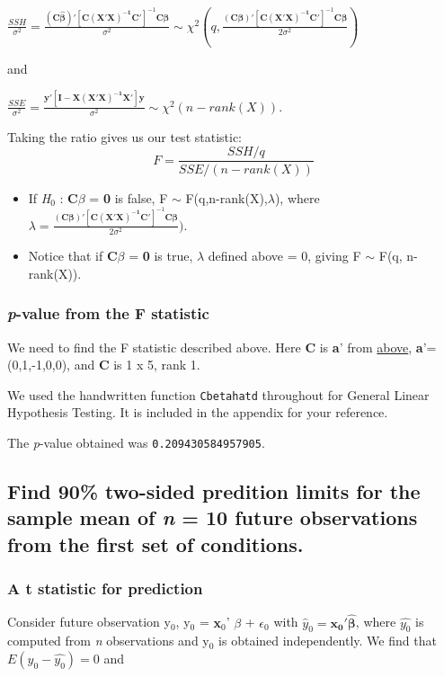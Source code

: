 \documentclass[11pt]{article}
\begin{document}
\(\frac{SSH}{\sigma^2} = \frac{(\mathbf{C\hat{\beta}})'[\mathbf{C(X'X)^{-1}C}']^{-1}\mathbf{C\hat{\beta}}}{\sigma^2}
\sim
\chi^2(q,\frac{(\mathbf{C\beta})'[\mathbf{C(X'X)^{-1}C}']^{-1}\mathbf{C\beta}}{2\sigma^2})\)

\noindent and

\(\frac{SSE}{\sigma^2} = \frac{\mathbf{y}'[\mathbf{I} -
\mathbf{X(X'X)^{-1}X}']\mathbf{y}}{\sigma^2} \sim \chi^2(n-rank(X)).\)

Taking the ratio gives us our test statistic:
$$F = \frac{SSH/q}{SSE/(n-rank(X))}$$

\begin{itemize}
\item If \emph{H$_0$} : \textbf{C$\beta$} = \textbf{0} is false, F $\sim$ F(q,n-rank(X),$\lambda$), where
  $\lambda =
  \frac{(\mathbf{C\beta})'[\mathbf{C(X'X)^{-1}C}']^{-1}\mathbf{C\beta}}{2\sigma^2})$.
\item Notice that if \textbf{C$\beta$} = \textbf{0} is true, $\lambda$ defined above = 0, giving F
  $\sim$ F(q, n-rank(X)).
\end{itemize}
\subsubsection{\emph{p}-value from the F statistic}
\label{sec-1-4-2}


We need to find the F statistic described above. Here \textbf{C} is \textbf{a}' from
\hyperref[Tau1Tau2]{above}, \textbf{a}'=(0,1,-1,0,0), and \textbf{C} is 1 x 5, rank 1.

We used the handwritten function \verb~Cbetahatd~ throughout for
General Linear Hypothesis Testing. It is included in the appendix for
your reference.

The \emph{p}-value obtained was \texttt{0.209430584957905}. 
\subsection{Find 90\% two-sided predition limits for the sample mean of \emph{n} = 10 future observations from the first set of conditions.}
\label{sec-1-5}
\subsubsection{A t statistic for prediction}
\label{sec-1-5-1}


Consider future observation y$_0$, y$_0$ = \textbf{x$_0$}' $\beta$ + $\epsilon$$_0$ with
$\hat{y}_0 = \mathbf{x_0'\hat{\beta}}$, where $\hat{y_0}$ is computed
from \emph{n} observations and y$_0$ is obtained independently. We find that
$E(y_0 - \hat{y_0}) = 0$ and 
\end{document}
